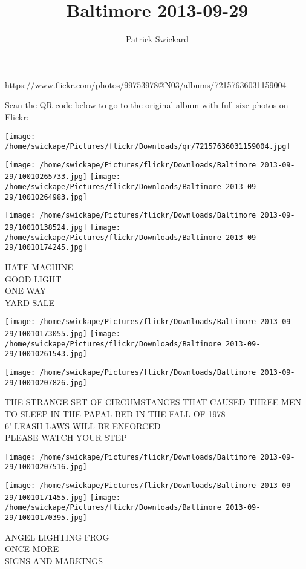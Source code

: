 \documentclass[10pt,letterpaper]{article}
\title{Baltimore 2013-09-29}
\author{Patrick Swickard}
\date{}
\begin{document}
\maketitle

\url{https://www.flickr.com/photos/99753978@N03/albums/72157636031159004}

Scan the QR code below to go to the original album with full-size photos on Flickr:

\texttt{[image: /home/swickape/Pictures/flickr/Downloads/qr/72157636031159004.jpg]}
\pagebreak

\texttt{[image: /home/swickape/Pictures/flickr/Downloads/Baltimore 2013-09-29/10010265733.jpg]}
\texttt{[image: /home/swickape/Pictures/flickr/Downloads/Baltimore 2013-09-29/10010264983.jpg]}

\texttt{[image: /home/swickape/Pictures/flickr/Downloads/Baltimore 2013-09-29/10010138524.jpg]}
\texttt{[image: /home/swickape/Pictures/flickr/Downloads/Baltimore 2013-09-29/10010174245.jpg]}

HATE MACHINE\\
GOOD LIGHT\\
ONE WAY\\
YARD SALE
\pagebreak

\texttt{[image: /home/swickape/Pictures/flickr/Downloads/Baltimore 2013-09-29/10010173055.jpg]}
\texttt{[image: /home/swickape/Pictures/flickr/Downloads/Baltimore 2013-09-29/10010261543.jpg]}

\texttt{[image: /home/swickape/Pictures/flickr/Downloads/Baltimore 2013-09-29/10010207826.jpg]}

THE STRANGE SET OF CIRCUMSTANCES THAT CAUSED THREE MEN TO SLEEP IN THE PAPAL BED IN THE FALL OF 1978\\
6' LEASH LAWS WILL BE ENFORCED\\
PLEASE WATCH YOUR STEP
\pagebreak

\texttt{[image: /home/swickape/Pictures/flickr/Downloads/Baltimore 2013-09-29/10010207516.jpg]}

\vspace{0.25in}
\texttt{[image: /home/swickape/Pictures/flickr/Downloads/Baltimore 2013-09-29/10010171455.jpg]}
\texttt{[image: /home/swickape/Pictures/flickr/Downloads/Baltimore 2013-09-29/10010170395.jpg]}

ANGEL LIGHTING FROG\\
ONCE MORE\\
SIGNS AND MARKINGS
\pagebreak
\end{document}

